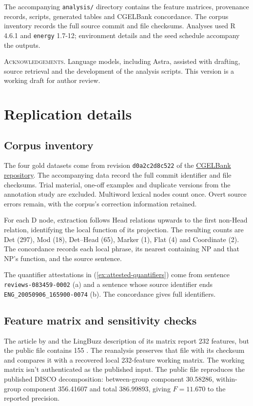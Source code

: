 \documentclass[12pt]{article}
\begin{document}
The accompanying \texttt{analysis/} directory contains the feature matrices, provenance records, scripts, generated tables and CGELBank concordance. The corpus inventory records the full source commit and file checksums. Analyses used R 4.6.1 and \texttt{energy} 1.7-12; environment details and the seed schedule accompany the outputs.

\vspace{0.5\baselineskip}
\noindent\textsc{Acknowledgements.} Language models, including Astra, assisted with drafting, source retrieval and the development of the analysis scripts. This version is a working draft for author review.

\appendix
\section{Replication details}\label{app:replication}

\subsection{Corpus inventory}

The four gold datasets come from revision \texttt{d0a2c2d8c522} of the \href{https://github.com/nert-nlp/cgel}{CGELBank repository}. The accompanying data record the full commit identifier and file checksums. Trial material, one-off examples and duplicate versions from the annotation study are excluded. Multiword lexical nodes count once. Overt source errors remain, with the corpus's correction information retained.

For each D node, extraction follows Head relations upwards to the first non-Head relation, identifying the local function of its projection. The resulting counts are Det (297), Mod (18), Det--Head (65), Marker (1), Flat (4) and Coordinate (2). The concordance records each local phrase, its nearest containing NP and that NP's function, and the source sentence.

The quantifier attestations in (\ref{ex:attested-quantifiers}) come from sentence \nolinkurl{reviews-083459-0002} (a) and a sentence whose source identifier ends \nolinkurl{ENG_20050906_165900-0074} (b). The concordance gives full identifiers.

\subsection{Feature matrix and sensitivity checks}

The article by \textcite{reynolds2021} and the LingBuzz description of its matrix report 232 features, but the public file contains 155 \citep{reynolds2021matrix}. The reanalysis preserves that file with its checksum and compares it with a recovered local 232-feature working matrix. The working matrix isn't authenticated as the published input. The public file reproduces the published DISCO decomposition: between-group component 30.58286, within-group component 356.41607 and total 386.99893, giving $F=11.670$ to the reported precision.
\end{document}
